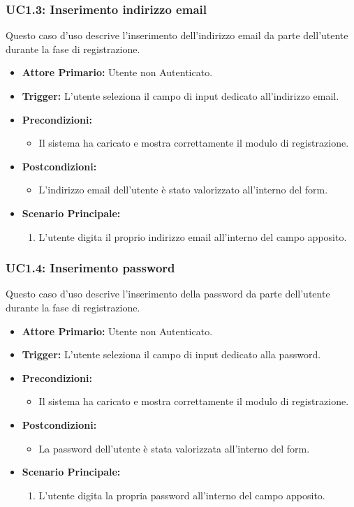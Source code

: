 \documentclass[12pt, a4paper]{article}
\begin{document}
\subsubsection{UC1.3: Inserimento indirizzo email}\label{uc:1.3}
Questo caso d'uso descrive l'inserimento dell'indirizzo email da parte dell'utente durante la fase di registrazione.
\begin{itemize}
    \item \textbf{Attore Primario:} Utente non Autenticato.
    \item \textbf{Trigger:} L'utente seleziona il campo di input dedicato all'indirizzo email.
    \item \textbf{Precondizioni:}\begin{itemize}\item Il sistema ha caricato e mostra correttamente il modulo di registrazione.\end{itemize}
    \item \textbf{Postcondizioni:}\begin{itemize}\item L'indirizzo email dell'utente è stato valorizzato all'interno del form.\end{itemize}
    \item \textbf{Scenario Principale:}
    \begin{enumerate}
        \item L'utente digita il proprio indirizzo email all'interno del campo apposito.
    \end{enumerate}
\end{itemize}

\subsubsection{UC1.4: Inserimento password}\label{uc:1.4}
Questo caso d'uso descrive l'inserimento della password da parte dell'utente durante la fase di registrazione.
\begin{itemize}
    \item \textbf{Attore Primario:} Utente non Autenticato.
    \item \textbf{Trigger:} L'utente seleziona il campo di input dedicato alla password.
    \item \textbf{Precondizioni:}\begin{itemize}\item Il sistema ha caricato e mostra correttamente il modulo di registrazione.\end{itemize}
    \item \textbf{Postcondizioni:}\begin{itemize}\item La password dell'utente è stata valorizzata all'interno del form.\end{itemize}
    \item \textbf{Scenario Principale:}
    \begin{enumerate}
        \item L'utente digita la propria password all'interno del campo apposito.
    \end{enumerate}
\end{itemize}
\end{document}
